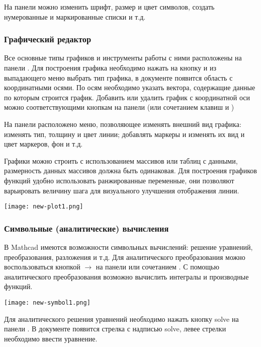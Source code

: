 На панели  можно изменить шрифт, размер и цвет символов, создать нумерованные и маркированные списки и т.д.

\subsubsection*{Графический редактор}
Все основные типы графиков и инструменты работы с ними расположены на панели . Для построения графика необходимо нажать на кнопку   и из выпадающего  меню выбрать тип графика, в документе появится область с координатными осями. По осям необходимо указать вектора, содержащие данные по которым строится график. 
Добавить или удалить график с координатной оси можно соответствующими кнопкам на панели  (или сочетанием клавиш \keys{ \shift + \enter} и \keys{\del} )

На панели расположено меню, позволяющее изменять внешний вид графика: изменять тип, толщину и цвет линии; добавлять маркеры и изменять их вид и цвет маркеров, фон и т.д.

Графики можно строить с использованием массивов или таблиц с данными, размерность данных массивов должна быть одинаковая. Для построения графиков функций удобно использовать ранжированные переменные, они позволяют варьировать величину шага для визуального улучшения отображения линии.

\begin{center}
	\texttt{[image: new-plot1.png]}
\end{center}


\subsubsection*{Символьные (аналитические) вычисления}
В Mathcad имеются возможности символьных вычислений: решение уравнений, преобразования, разложения и т.д. Для аналитического преобразования можно воспользоваться кнопкой $\rightarrow$ на панели   или сочетанием . С помощью аналитического преобразования возможно вычислить интегралы и производные функций.
\begin{center}
	\texttt{[image: new-symbol1.png]}
\end{center}


Для аналитического решения уравнений необходимо нажать кнопку solve  на панели  . В документе появится стрелка с надписью solve, левее стрелки необходимо ввести уравнение.


